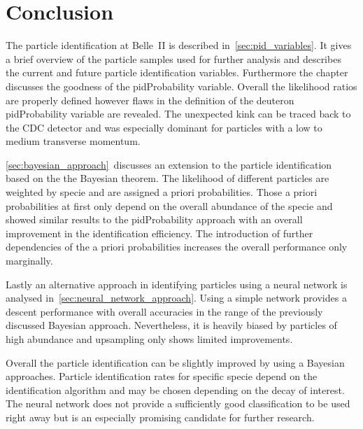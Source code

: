 \chapter{Conclusion}
\label{chap:conclusion}

The particle identification at Belle~\RN{2} is described in~\autoref{sec:pid_variables}. It gives a brief overview of the particle samples used for further analysis and describes the current and future particle identification variables. Furthermore the chapter discusses the goodness of the pidProbability variable. Overall the likelihood ratios are properly defined however flaws in the definition of the deuteron pidProbability variable are revealed. The unexpected kink can be traced back to the CDC detector and was especially dominant for particles with a low to medium transverse momentum.

\autoref{sec:bayesian_approach}~discusses an extension to the particle identification based on the the Bayesian theorem. The likelihood of different particles are weighted by specie and are assigned a priori probabilities. Those a priori probabilities at first only depend on the overall abundance of the specie and showed similar results to the pidProbability approach with an overall improvement in the identification efficiency. The introduction of further dependencies of the a priori probabilities increases the overall performance only marginally.

Lastly an alternative approach in identifying particles using a neural network is analysed in~\autoref{sec:neural_network_approach}. Using a simple network provides a descent performance with overall accuracies in the range of the previously discussed Bayesian approach. Nevertheless, it is heavily biased by particles of high abundance and upsampling only shows limited improvements.

Overall the particle identification can be slightly improved by using a Bayesian approaches. Particle identification rates for specific specie depend on the identification algorithm and may be chosen depending on the decay of interest. The neural network does not provide a sufficiently good classification to be used right away but is an especially promising candidate for further research.
